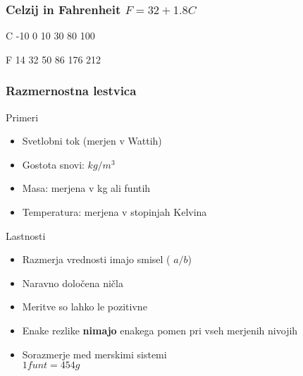 \begin{frame}[fragile]
\frametitle{Celzij in Fahrenheit \hfill $F = 32 + 1.8 C$}
\begin{center}
\begin{Schunk}
\begin{Soutput}
C  -10    0   10   30   80  100
\end{Soutput}
\begin{Soutput}
F   14   32   50   86  176  212
\end{Soutput}
\end{Schunk}
\end{center}

\end{frame}


\begin{frame}[fragile]
\frametitle{Razmernostna lestvica}
\begin{block}{Primeri}

\begin{itemize}
  \item Svetlobni tok (merjen v Wattih)
  \item Gostota snovi: $kg/m^3$
  \item Masa: merjena v kg ali funtih
  \item Temperatura: merjena v stopinjah Kelvina
\end{itemize}
\end{block}
\begin{block}{Lastnosti}

\begin{itemize}
  \item Razmerja vrednosti imajo smisel ( $ a / b $)
  \item Naravno določena ničla
  \item Meritve so lahko le pozitivne
  \item Enake rezlike \textbf{nimajo} enakega pomen pri vseh merjenih nivojih
  \item Sorazmerje med merskimi sistemi \\
   $1 funt = 454 g $ 
  \end{itemize}
\end{block}
\end{frame}










